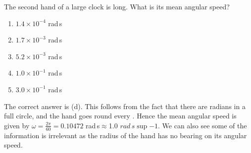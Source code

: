 
\begin{problem}[A1987PIQ7l] 
{The second hand of a large clock is  long. What is its mean angular speed?
\begin{enumerate}
	\item $1.4 \times 10^{-4}$ {rad\,s}
	\item $1.7 \times 10^{-3}$ {rad\,s}
	\item $5.2 \times 10^{-3}$ {rad\,s}
	\item $1.0 \times 10^{-1}$ {rad\,s} \answer
	\item $3.0 \times 10^{-1}$ {rad\,s}
\end{enumerate}}
{}
{The correct answer is (d). This follows from the fact that there are \vari{2\pi} radians in a full circle, and the hand goes round every . Hence the mean angular speed is given by $\omega=\frac{2\pi}{60} = 0.10472$ {rad\,s}$ \approx $1.0 $ {rad\,s\sup{-1}}$. We can also see some of the information is irrelevant as the radius of the hand has no bearing on its angular speed.}
\end{problem}